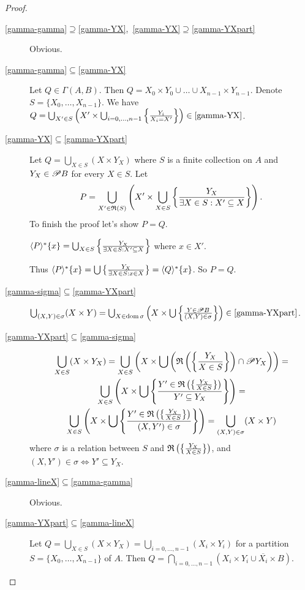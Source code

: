 \begin{proof}
~
\begin{description}
\item [{\ref{gamma-gamma}$\supseteq$\ref{gamma-YX},~\ref{gamma-YX}$\supseteq$\ref{gamma-YXpart}}] Obvious.
\item [{\ref{gamma-gamma}$\subseteq$\ref{gamma-YX}}] Let $Q\in\Gamma(A,B)$.
Then $Q=X_{0}\times Y_{0}\cup\ldots\cup X_{n-1}\times Y_{n-1}$. Denote
$S=\{X_{0},\ldots,X_{n-1}\}$. We have $Q=\bigcup_{X'\in S}\left(X'\times\bigcup_{i=0,\dots,n-1}\left\{ \frac{Y_{i}}{X_{i}=X'}\right\}\right)\in\text{\ref{gamma-YX}}$.
\item [{\ref{gamma-YX}$\subseteq$\ref{gamma-YXpart}}] Let $Q=\bigcup_{X\in S}(X\times Y_{X})$
where $S$ is a finite collection on $A$ and $Y_{X}\in\mathscr{P} B$
for every $X\in S$. Let 
\[
P=\bigcup_{X'\in\mathfrak{R}(S)}\left(X'\times\bigcup_{X\in S}\left\{ \frac{Y_{X}}{\exists X\in S:X'\subseteq X}\right\}\right).
\]
To finish the proof let's show $P=Q$.


$\langle P\rangle^{\ast}\{x\}=\bigcup_{X\in S}\left\{ \frac{Y_{X}}{\exists X\in S:X'\subseteq X}\right\}$
where $x\in X'$.


Thus $\langle P\rangle^{\ast}\{x\}=\bigcup\left\{ \frac{Y_{X}}{\exists X\in S:x\in X}\right\}=\langle Q\rangle^{\ast}\{x\}$.
So $P=Q$.

\item [{\ref{gamma-sigma}$\subseteq$\ref{gamma-YXpart}}] $\bigcup_{(X,Y)\in\sigma}(X\times Y)=\bigcup_{X\in\operatorname{dom}\sigma}\left(X\times\bigcup\left\{ \frac{Y\in\mathscr{P} B}{(X,Y)\in\sigma}\right\}\right)\in\text{\text{\ref{gamma-YXpart}}}$.
\item [{\ref{gamma-YXpart}$\subseteq$\ref{gamma-sigma}}] 
\begin{multline*}
\bigcup_{X\in S}(X\times Y_{X})=\bigcup_{X\in S}\left(X\times\bigcup\left(\mathfrak{R}\left(\left\{ \frac{Y_{X}}{X\in S}\right\}\right)\cap\mathscr{P} Y_{X}\right)\right)=\\
\bigcup_{X\in S}\left(X\times\bigcup\left\{ \frac{Y'\in\mathfrak{R}\left(\left\{ \frac{Y_{X}}{X\in S}\right\}\right)}{Y'\subseteq Y_{X}}\right\}\right)=\\
\bigcup_{X\in S}\left(X\times\bigcup\left\{ \frac{Y'\in\mathfrak{R}\left(\left\{ \frac{Y_{X}}{X\in S}\right\}\right)}{(X,Y')\in\sigma}\right\}\right)=\bigcup_{(X,Y)\in\sigma}(X\times Y)
\end{multline*}
 where $\sigma$ is a relation between $S$ and $\mathfrak{R}\left(\left\{ \frac{Y_{X}}{X\in S}\right\}\right)$,
and $(X,Y')\in\sigma\Leftrightarrow Y'\subseteq Y_{X}$.
\item [{\ref{gamma-lineX}$\subseteq$\ref{gamma-gamma}}] Obvious.
\item [{\ref{gamma-YXpart}$\subseteq$\ref{gamma-lineX}}] Let $Q=\bigcup_{X\in S}(X\times Y_{X})=\bigcup_{i=0,\ldots,n-1}(X_{i}\times Y_{i})$
for a partition $S=\{X_{0},\ldots,X_{n-1}\}$ of $A$. Then $Q=\bigcap_{i=0,\ldots,n-1}\left(X_{i}\times Y_{i}\cup\overline{X_{i}}\times B\right)$.
\end{description}
\end{proof}
